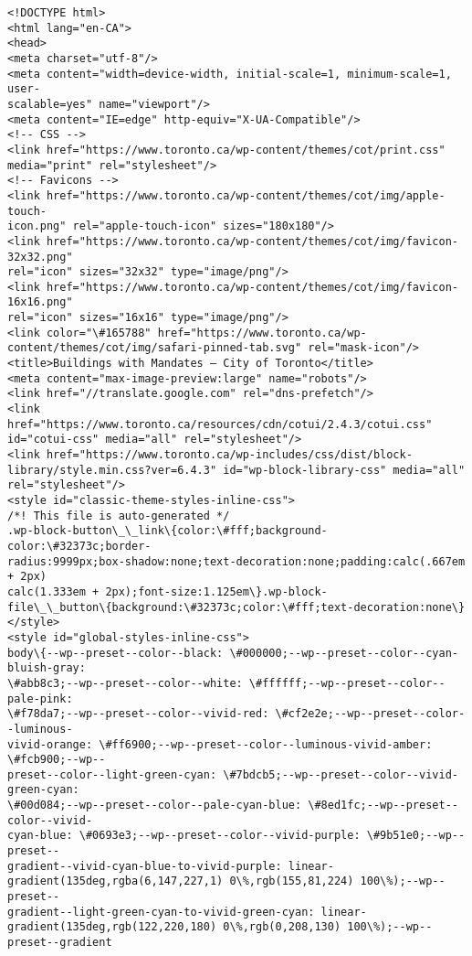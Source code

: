 \documentclass[11pt]{article}
\begin{document}
    \begin{Verbatim}[commandchars=\\\{\}]
<!DOCTYPE html>
<html lang="en-CA">
<head>
<meta charset="utf-8"/>
<meta content="width=device-width, initial-scale=1, minimum-scale=1, user-
scalable=yes" name="viewport"/>
<meta content="IE=edge" http-equiv="X-UA-Compatible"/>
<!-- CSS -->
<link href="https://www.toronto.ca/wp-content/themes/cot/print.css"
media="print" rel="stylesheet"/>
<!-- Favicons -->
<link href="https://www.toronto.ca/wp-content/themes/cot/img/apple-touch-
icon.png" rel="apple-touch-icon" sizes="180x180"/>
<link href="https://www.toronto.ca/wp-content/themes/cot/img/favicon-32x32.png"
rel="icon" sizes="32x32" type="image/png"/>
<link href="https://www.toronto.ca/wp-content/themes/cot/img/favicon-16x16.png"
rel="icon" sizes="16x16" type="image/png"/>
<link color="\#165788" href="https://www.toronto.ca/wp-
content/themes/cot/img/safari-pinned-tab.svg" rel="mask-icon"/>
<title>Buildings with Mandates – City of Toronto</title>
<meta content="max-image-preview:large" name="robots"/>
<link href="//translate.google.com" rel="dns-prefetch"/>
<link href="https://www.toronto.ca/resources/cdn/cotui/2.4.3/cotui.css"
id="cotui-css" media="all" rel="stylesheet"/>
<link href="https://www.toronto.ca/wp-includes/css/dist/block-
library/style.min.css?ver=6.4.3" id="wp-block-library-css" media="all"
rel="stylesheet"/>
<style id="classic-theme-styles-inline-css">
/*! This file is auto-generated */
.wp-block-button\_\_link\{color:\#fff;background-color:\#32373c;border-
radius:9999px;box-shadow:none;text-decoration:none;padding:calc(.667em + 2px)
calc(1.333em + 2px);font-size:1.125em\}.wp-block-
file\_\_button\{background:\#32373c;color:\#fff;text-decoration:none\}
</style>
<style id="global-styles-inline-css">
body\{--wp--preset--color--black: \#000000;--wp--preset--color--cyan-bluish-gray:
\#abb8c3;--wp--preset--color--white: \#ffffff;--wp--preset--color--pale-pink:
\#f78da7;--wp--preset--color--vivid-red: \#cf2e2e;--wp--preset--color--luminous-
vivid-orange: \#ff6900;--wp--preset--color--luminous-vivid-amber: \#fcb900;--wp--
preset--color--light-green-cyan: \#7bdcb5;--wp--preset--color--vivid-green-cyan:
\#00d084;--wp--preset--color--pale-cyan-blue: \#8ed1fc;--wp--preset--color--vivid-
cyan-blue: \#0693e3;--wp--preset--color--vivid-purple: \#9b51e0;--wp--preset--
gradient--vivid-cyan-blue-to-vivid-purple: linear-
gradient(135deg,rgba(6,147,227,1) 0\%,rgb(155,81,224) 100\%);--wp--preset--
gradient--light-green-cyan-to-vivid-green-cyan: linear-
gradient(135deg,rgb(122,220,180) 0\%,rgb(0,208,130) 100\%);--wp--preset--gradient

\end{Verbatim}
\end{document}
